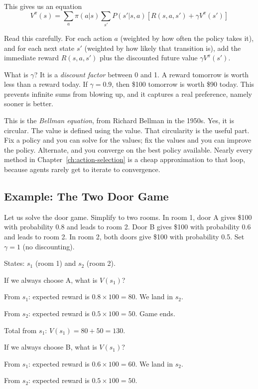 This gives us an equation
\[
V^\pi(s) = \sum_{a} \pi(a|s) \sum_{s'} P(s'|s,a) \left[ R(s,a,s') + \gamma V^\pi(s') \right]
\]

Read this carefully. For each action $a$ (weighted by how often the policy takes it), and for each next state $s'$ (weighted by how likely that transition is), add the immediate reward $R(s,a,s')$ plus the discounted future value $\gamma V^\pi(s')$.

What is $\gamma$? It is a \textit{discount factor} between 0 and 1. A reward tomorrow is worth less than a reward today. If $\gamma = 0.9$, then \$100 tomorrow is worth \$90 today. This prevents infinite sums from blowing up, and it captures a real preference, namely sooner is better.

This is the \textit{Bellman equation}, from Richard Bellman in the 1950s. Yes, it is circular. The value is defined using the value. That circularity is the useful part. Fix a policy and you can solve for the values; fix the values and you can improve the policy. Alternate, and you converge on the best policy available. Nearly every method in Chapter~\ref{ch:action-selection} is a cheap approximation to that loop, because agents rarely get to iterate to convergence.

\subsection{Example: The Two Door Game}

Let us solve the door game. Simplify to two rooms. In room 1, door A gives \$100 with probability 0.8 and leads to room 2. Door B gives \$100 with probability 0.6 and leads to room 2. In room 2, both doors give \$100 with probability 0.5. Set $\gamma = 1$ (no discounting).

States: $s_1$ (room 1) and $s_2$ (room 2).

If we always choose A, what is $V(s_1)$?

From $s_1$: expected reward is $0.8 \times 100 = 80$. We land in $s_2$.

From $s_2$: expected reward is $0.5 \times 100 = 50$. Game ends.

Total from $s_1$: $V(s_1) = 80 + 50 = 130$.

If we always choose B, what is $V(s_1)$?

From $s_1$: expected reward is $0.6 \times 100 = 60$. We land in $s_2$.

From $s_2$: expected reward is $0.5 \times 100 = 50$.

